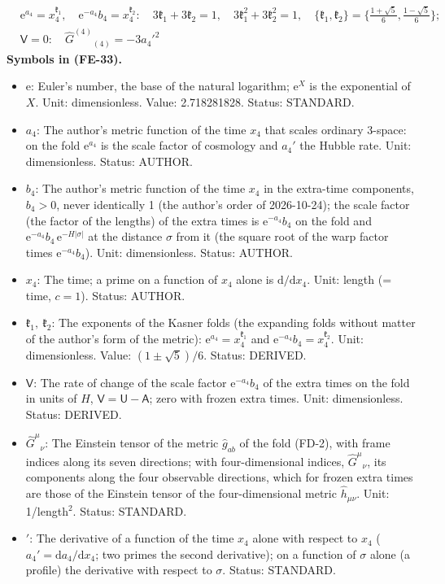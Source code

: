 \documentclass[
  10pt,
]{article}
\providecommand{\tightlist}{%
  \setlength{\itemsep}{0pt}\setlength{\parskip}{0pt}}
\begin{document}
\[
\begin{aligned}
&\mathrm{e}^{a_4} = x_4^{\mathfrak{k}_1},\quad \mathrm{e}^{-a_4}b_4 = x_4^{\mathfrak{k}_2}:\quad
 3\mathfrak{k}_1 + 3\mathfrak{k}_2 = 1,\quad 3\mathfrak{k}_1^2 + 3\mathfrak{k}_2^2 = 1,\quad
 \{\mathfrak{k}_1, \mathfrak{k}_2\} = \Big\{\frac{1 + \sqrt5}{6}, \frac{1 - \sqrt5}{6}\Big\};\\
&\mathsf{V} = 0:\quad \hat G^{(4)}{}_{(4)} = -3a_4'^2
\end{aligned} \tag{FE-33}
\] \textbf{Symbols in (FE-33).}

\begin{itemize}
\tightlist
\item
  \(\mathrm{e}\): Euler's number, the base of the natural logarithm;
  \(\mathrm{e}^{X}\) is the exponential of \(X\). Unit: dimensionless.
  Value: 2.718281828. Status: STANDARD.
\item
  \(a_4\): The author's metric function of the time \(x_4\) that scales
  ordinary 3-space: on the fold \(\mathrm{e}^{a_4}\) is the scale factor
  of cosmology and \(a_4'\) the Hubble rate. Unit: dimensionless.
  Status: AUTHOR.
\item
  \(b_4\): The author's metric function of the time \(x_4\) in the
  extra-time components, \(b_4 > 0\), never identically 1 (the author's
  order of 2026-10-24); the scale factor (the factor of the lengths) of
  the extra times is \(\mathrm{e}^{-a_4}b_4\) on the fold and
  \(\mathrm{e}^{-a_4}b_4\,\mathrm{e}^{-H\lvert\sigma\rvert}\) at the
  distance \(\sigma\) from it (the square root of the warp factor times
  \(\mathrm{e}^{-a_4}b_4\)). Unit: dimensionless. Status: AUTHOR.
\item
  \(x_4\): The time; a prime on a function of \(x_4\) alone is
  \(\mathrm{d}/\mathrm{d}x_4\). Unit: length (= time, \(c = 1\)).
  Status: AUTHOR.
\item
  \(\mathfrak{k}_1,\ \mathfrak{k}_2\): The exponents of the Kasner folds
  (the expanding folds without matter of the author's form of the
  metric): \(\mathrm{e}^{a_4} = x_4^{\mathfrak{k}_1}\) and
  \(\mathrm{e}^{-a_4}b_4 = x_4^{\mathfrak{k}_2}\). Unit: dimensionless.
  Value: \((1 \pm \sqrt5)/6\). Status: DERIVED.
\item
  \(\mathsf{V}\): The rate of change of the scale factor
  \(\mathrm{e}^{-a_4}b_4\) of the extra times on the fold in units of
  \(H\), \(\mathsf{V} = \mathsf{U} - \mathsf{A}\); zero with frozen
  extra times. Unit: dimensionless. Status: DERIVED.
\item
  \(\hat G^\mu{}_\nu\): The Einstein tensor of the metric
  \(\hat g_{ab}\) of the fold (FD-2), with frame indices along its seven
  directions; with four-dimensional indices, \(\hat G^\mu{}_\nu\), its
  components along the four observable directions, which for frozen
  extra times are those of the Einstein tensor of the four-dimensional
  metric \(\hat h_{\mu\nu}\). Unit: 1/length\(^2\). Status: STANDARD.
\item
  \({}'\): The derivative of a function of the time \(x_4\) alone with
  respect to \(x_4\) (\(a_4' = \mathrm{d}a_4/\mathrm{d}x_4\); two primes
  the second derivative); on a function of \(\sigma\) alone (a profile)
  the derivative with respect to \(\sigma\). Status: STANDARD.
\end{itemize}
\end{document}
